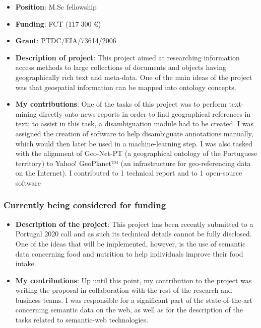 \begin{itemize}
    \item \textbf{Position}: M.Sc fellowship
    \item \textbf{Funding}: FCT (117$\;$300 €)
    \item \textbf{Grant}: PTDC/EIA/73614/2006
    \item \textbf{Description of project}: This project aimed at researching information access methods to large collections of documents and objects having geographically rich text and meta-data. One of the main ideas of the project was that geospatial information can be mapped into ontology concepts.
    \item \textbf{My contributions}: One of the tasks of this project was to perform text-mining directly onto news reports in order to find geographical references in text; to assist in this task, a disambiguation module had to be created. I was assigned the creation of software to help disambiguate annotations manually, which would then later be used in a machine-learning step. I was also tasked with the alignment of Geo-Net-PT (a geographical ontology of the Portuguese territory) to Yahoo! GeoPlanet™ (an infrastructure for geo-referencing data on the Internet). I contributed to 1 technical report and to 1 open-source software
\end{itemize}


\subsubsection{Currently being considered for funding}

\begin{itemize}
    \item \textbf{Description of the project}: This project has been recently submitted to a Portugal 2020 call and as such its technical details cannot be fully disclosed. One of the ideas that will be implemented, however, is the use of semantic data concerning food and nutrition to help individuals improve their food intake.
    \item \textbf{My contributions}: Up until this point, my contribution to the project was writing the proposal in collaboration with the rest of the research and business teams. I was responsible for a significant part of the state-of-the-art concerning semantic data on the web, as well as for the description of the tasks related to semantic-web technologies.
\end{itemize}


